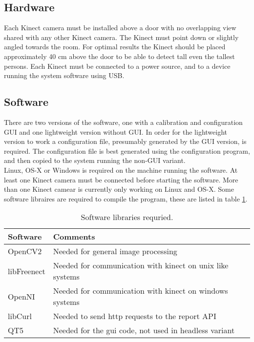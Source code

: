 \subsection{Hardware}
Each Kinect camera must be installed above a door with no overlapping view shared with any other Kinect camera. The Kinect must point down or slightly angled towards the room. For optimal results the Kinect should be placed approximately 40 cm above the door to be able to detect tall even the tallest persons. Each Kinect must be connected to a power source, and to a device running the system software using USB.

\subsection{Software}
There are two versions of the software, one with a calibration and configuration GUI and one lightweight version without GUI. In order for the lightweight version to work a configuration file, presumably generated by the GUI version, is required. The configuration file is best generated using the configuration program, and then copied to the system running the non-GUI variant. \\

Linux, OS-X or Windows is required on the machine running the software. At least one Kinect camera must be connected before starting the software. More than one Kinect camear is currently only working on Linux and OS-X. Some software libraires are required to compile the program, these are listed in table \ref{reqSoftware}. \\

\begin{table} [hbt]
\begin{center}
  \begin{tabular}{ | l | l | }
    \hline
    \textbf{Software} & \textbf{Comments} \\ \hline
    OpenCV2 & Needed for general image processing  \\ \hline
    libFreenect & Needed for communication with kinect on unix like systems  \\ \hline
    OpenNI & Needed for communication with kinect on windows systems  \\ \hline
    libCurl & Needed to send http requests to the report API \\ \hline
    QT5 & Needed for the gui code, not used in headless variant \\ \hline
  \end{tabular}
  \label{reqSoftware}
  \caption{Software libraries requried.}
\end{center}
\end{table}